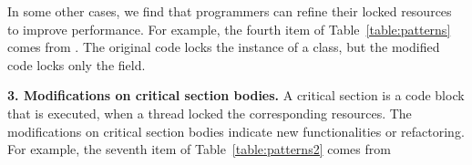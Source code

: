 

In some other cases, we find that programmers can refine their locked resources to improve performance. For example, the fourth item of Table~\ref{table:patterns} comes from . The original code locks the instance of a class, but the modified code locks only the  field.


\noindent
\textbf{3. Modifications on critical section bodies.} A critical section is a code block that is executed, when a thread locked the corresponding resources. The modifications on critical section bodies indicate new functionalities or refactoring. For example, the seventh item of Table~\ref{table:patterns2} comes from




